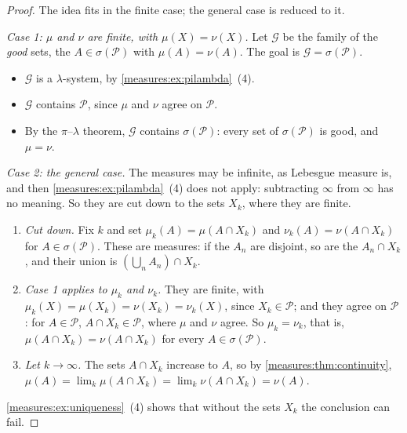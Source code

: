 \begin{notechapter}
\begin{proof}
The idea fits in the finite case; the general case is reduced to it.

\emph{Case 1: $\mu$ and $\nu$ are finite, with $\mu(X) = \nu(X)$.}
Let $\mathcal G$ be the family of the \emph{good} sets, the
$A\in\sigma(\mathcal P)$ with $\mu(A) = \nu(A)$. The goal is
$\mathcal G = \sigma(\mathcal P)$.
\begin{itemize}[nosep]
  \item $\mathcal G$ is a $\lambda$-system, by
        \cref{measures:ex:pilambda}~(4).
  \item $\mathcal G$ contains $\mathcal P$, since $\mu$ and $\nu$ agree
        on $\mathcal P$.
  \item By the $\pi$--$\lambda$ theorem, $\mathcal G$ contains
        $\sigma(\mathcal P)$: every set of $\sigma(\mathcal P)$ is good,
        and $\mu = \nu$.
\end{itemize}

\emph{Case 2: the general case.} The measures may be infinite, as
Lebesgue measure is, and then \cref{measures:ex:pilambda}~(4) does not
apply: subtracting $\infty$ from $\infty$ has no meaning. So they are
cut down to the sets $X_k$, where they are finite.
\begin{enumerate}[nosep]
  \item \emph{Cut down.} Fix $k$ and set $\mu_k(A) = \mu(A\cap X_k)$ and
        $\nu_k(A) = \nu(A\cap X_k)$ for $A\in\sigma(\mathcal P)$. These
        are measures: if the $A_n$ are disjoint, so are the
        $A_n\cap X_k$, and their union is $(\bigcup_nA_n)\cap X_k$.
  \item \emph{Case 1 applies to $\mu_k$ and $\nu_k$.} They are finite,
        with $\mu_k(X) = \mu(X_k) = \nu(X_k) = \nu_k(X)$, since
        $X_k\in\mathcal P$; and they agree on $\mathcal P$: for
        $A\in\mathcal P$, $A\cap X_k\in\mathcal P$, where $\mu$ and
        $\nu$ agree. So $\mu_k = \nu_k$, that is,
        $\mu(A\cap X_k) = \nu(A\cap X_k)$ for every
        $A\in\sigma(\mathcal P)$.
  \item \emph{Let $k\to\infty$.} The sets $A\cap X_k$ increase to $A$,
        so by \cref{measures:thm:continuity},
        $\mu(A) = \lim_k\mu(A\cap X_k) = \lim_k\nu(A\cap X_k) = \nu(A)$.
\end{enumerate}
\cref{measures:ex:uniqueness}~(4) shows that without the sets $X_k$ the
conclusion can fail.
\end{proof}


\end{notechapter}
